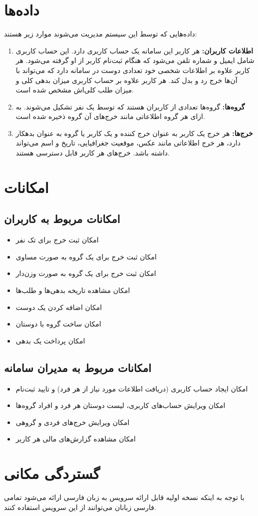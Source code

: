 \section{داده‌ها}
داده‌هایی که توسط این سیستم مدیریت می‌شوند موارد زیر هستند:
\begin{enumerate}
\item \textbf{اطلاعات کاربران:}
هر کاربر این سامانه یک حساب کاربری دارد. این حساب کاربری شامل ایمیل و شماره تلفن می‌شود که هنگام ثبت‌نام کاربر از او گرفته می‌شود. هر کاربر علاوه بر اطلاعات شخصی خود تعدادی دوست در سامانه دارد که می‌تواند با آن‌ها خرج رد و بدل کند. هر کاربر علاوه بر حساب کاربری میزان بدهی کلی و میزان طلب کلی‌ا‌ش مشخص شده است.
\item \textbf{گروه‌ها:}
گروه‌ها تعدادی از کاربران هستند که توسط یک نفر تشکیل می‌شوند. به ازای هر گروه اطلاعاتی مانند خرج‌های آن گروه ذخیره شده است.
\item \textbf{خرج‌ها:}
هر خرج یک کاربر به عنوان خرج کننده و یک کاربر یا گروه به عنوان بدهکار دارد، هر خرج اطلاعاتی مانند عکس، موقعیت جغرافیایی، تاریخ و اسم می‌تواند داشته باشد. خرج‌های هر کاربر قابل دسترسی هستند.
\end{enumerate}

\section{امکانات}
\subsection{
امکانات مربوط به کاربران} 
\begin{itemize}
	\item
	امکان ثبت خرج برای تک نفر
	\item
	امکان ثبت خرج برای یک گروه به صورت مساوی
	\item
	امکان ثبت خرج برای یک گروه به صورت وزن‌دار
	\item
	امکان مشاهده تاریخه بدهی‌ها و طلب‌ها
	 \item
	امکان اضافه کردن یک دوست 
		 \item
	امکان ساخت گروه با دوستان
		 \item
	امکان پرداخت یک بدهی 
\end{itemize}
\subsection{
امکانات مربوط به مدیران سامانه}
\begin{itemize}
	\item 
امکان ایجاد حساب کاربری (دریافت اطلاعات مورد نیاز از هر فرد) و تایید ثبت‌نام 
\item 
امکان ویرایش حساب‌های کاربری، لیست دوستان هر فرد و افراد گروه‌ها
 \item 
امکان ویرایش خرج‌های فردی و گروهی
\item
امکان مشاهده گزارش‌های مالی هر کاربر
\end{itemize}

\section{گستردگی مکانی}
با توجه به اینکه نسخه اولیه قابل ارائه سرویس به زبان فارسی ارائه می‌شود تمامی فارسی زبانان می‌توانند از این سرویس استفاده کنند.
